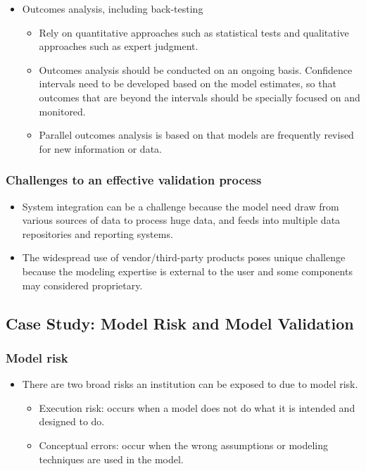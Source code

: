 \begin{itemize}
\item Outcomes analysis, including back-testing
    \begin{itemize}
    \item Rely on quantitative approaches such as statistical tests and qualitative approaches such as expert judgment.
    \item Outcomes analysis should be conducted on an ongoing basis. Confidence intervals need to be developed based on the model estimates, so that outcomes that are beyond the intervals should be specially focused on and monitored.
    \item Parallel outcomes analysis is based on that models are frequently revised for new information or data.
    \end{itemize}
    
\end{itemize}




\subsubsection{Challenges to an effective validation process}
\begin{itemize}
\item System integration can be a challenge because the model need draw from various sources of data to process huge data, and feeds into multiple data repositories and reporting systems.
\item The widespread use of vendor/third-party products poses unique challenge because the modeling expertise is external to the user and some components may considered proprietary.
\end{itemize}




\subsection{ Case Study: Model Risk and Model Validation}




\subsubsection{Model risk}
\begin{itemize}
\item There are two broad risks an institution can be exposed to due to model risk.
    \begin{itemize}
    \item Execution risk: occurs when a model does not do what it is intended and designed to do.
    \item Conceptual errors: occur when the wrong assumptions or modeling techniques are used in the model.
    \end{itemize}
\end{itemize}




